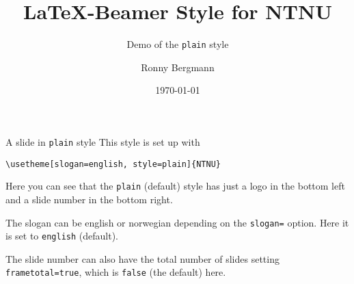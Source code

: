 \documentclass[aspectratio=169]{beamer}
\title{\LaTeX{}-Beamer Style for NTNU}
\subtitle{Demo of the  \texttt{plain} style}
\author{Ronny Bergmann}
\date{\today}
\begin{document}
	\maketitle
    \begin{frame}[fragile]{A slide in \texttt{plain} style}
        This style is set up with

        \lstinline!\usetheme[slogan=english, style=plain]{NTNU}!

        Here you can see that the \texttt{plain} (default) style has just a logo in the bottom left and a slide number in the bottom right.

        The slogan can be english or norwegian depending on the \lstinline!slogan=! option. Here it is set to \lstinline!english! (default).

        The slide number can also have the total number of slides setting \lstinline!frametotal=true!, which is \lstinline!false! (the default) here.
    \end{frame}
\end{document}
